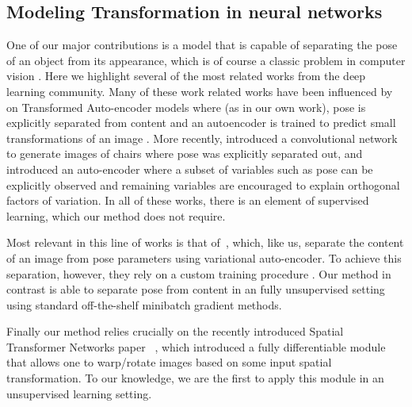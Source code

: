 \subsection{Modeling Transformation in neural networks}
One of our major contributions is a model that is capable of separating the pose of an object from its appearance,
which is of course a classic problem in computer vision . 
Here we highlight several of the most related works from 
the deep learning community.  
Many of these work related works have been influenced by \cite{hinton2011transforming} on Transformed Auto-encoder models
where (as in our own work), pose is explicitly separated from content and an autoencoder is trained to predict small transformations of an image .	
More recently,  \cite{dosovitskiy2014learning} introduced a convolutional network to generate images of chairs where pose was explicitly separated out, and
\cite{cheung2014discovering} introduced an auto-encoder where a subset of variables such as pose can be explicitly observed and remaining
variables are encouraged to explain orthogonal factors of variation.   
In all of these works, there is an element of supervised learning, which our method does not require. 

Most relevant in this line of works is that of~\cite{kulkarni2015deep}, which, like us, 
separate the content of an image from pose parameters using variational auto-encoder.
To achieve this separation, however, they rely on a custom training procedure 
.
Our method in contrast is able to separate pose from content in an fully unsupervised setting 
using standard off-the-shelf minibatch gradient methods.

Finally our method relies crucially on the recently introduced Spatial Transformer Networks paper ~\citep{jaderberg2015spatial}, which introduced 
a fully differentiable module that allows one to warp/rotate images based on some input spatial transformation.
To our knowledge, we are the first to apply this module in an unsupervised learning setting.  


